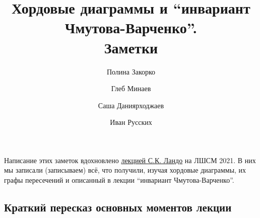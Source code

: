 \documentclass[12pt,a4paper]{article}
\title{Хордовые диаграммы и ``инвариант Чмутова-Варченко''.\\ Заметки}
\author{Полина Закорко\and Глеб Минаев\and Саша Даниярходжаев\and Иван Русских}
\begin{document}
    \maketitle

    \listoftodos[TODOs]
    \par

    \vspace{2em}
    Написание этих заметок вдохновлено \href{https://mccme.ru/dubna/2021/courses/lando.html}{лекцией С.К. Ландо} на ЛШСМ 2021. В них мы записали (записываем) всё, что получили, изучая хордовые диаграммы, их графы пересечений и описанный в лекции ``инвариант Чмутова-Варченко''.

    \subsection{Краткий пересказ основных моментов лекции}
\end{document}
